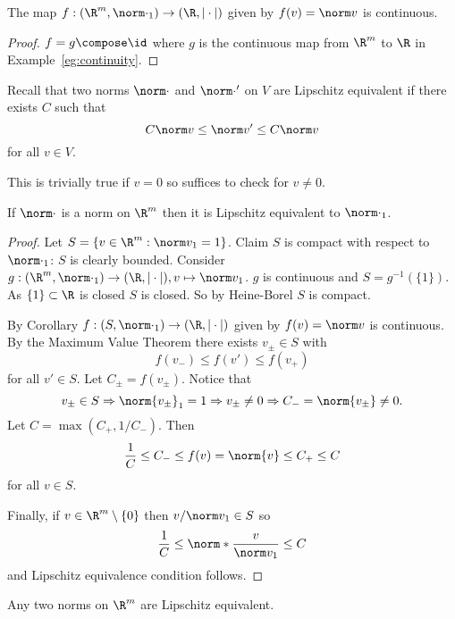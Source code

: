 \documentclass[a4paper]{article}
\theoremstyle{definition}
\begin{document}
\begin{corollary}
  The map \(f:(\R^m, \norm \cdot_1) \to (\R, |\cdot|)\) given by \(f(v) = \norm v\) is continuous.
\end{corollary}

\begin{proof}
  \(f = g\compose \id\) where \(g\) is the continuous map from \(\R^m\) to \(\R\) in Example~\ref{eg:continuity}.
\end{proof}

Recall that two norms \(\norm \cdot\) and \(\norm \cdot'\) on \(V\) are Lipschitz equivalent if there exists \(C\) such that
\[
  C\norm v \leq \norm v' \leq C \norm v
\]
for all \(v\in V\).

\begin{remark}
  This is trivially true if \(v=0\) so suffices to check for \(v\neq0\).
\end{remark}

\begin{theorem}
  \label{thm:Lipschitz equivalence}
  If \(\norm \cdot\) is a norm on \(\R^m\) then it is Lipschitz equivalent to \(\norm \cdot_1\).
\end{theorem}

\begin{proof}
  \label{proof:Lipschitz equivalence}
  Let \(S = \{v\in \R^m: \norm v_1 = 1 \}\). Claim \(S\) is compact with respect to \(\norm \cdot_1\): \(S\) is clearly bounded. Consider \(g:(\R^m, \norm \cdot_1) \to (\R, |\cdot|), v\mapsto \norm v_1\). \(g\) is continuous and \(S = g^{-1}(\{1\})\). As \(\{1\} \subset \R\) is closed \(S\) is closed. So by Heine-Borel \(S\) is compact.

  By Corollary \(f:(S, \norm \cdot_1) \to (\R, |\cdot|)\) given by \(f(v) = \norm v\) is continuous. By the Maximum Value Theorem there exists \(v_\pm\in S\) with
  \[
    f(v_-) \leq f(v') \leq f(v_+)
  \]
  for all \(v' \in S\). Let \(C_\pm = f(v_\pm)\). Notice that
  \[
    v_\pm\in S \Rightarrow \norm{v_\pm}_1 = 1 \Rightarrow v_\pm \neq0 \Rightarrow C_-=\norm{v_\pm} \neq 0.
  \]
  Let \(C = \max(C_+,1/C_-)\). Then
  \[
    \frac{1}{C} \leq C_- \leq f(v) = \norm{v} \leq C_+ \leq C
  \]
  for all \(v \in S\).

  Finally, if \(v \in \R^m\setminus\{0\}\) then \(v/\norm v_1 \in S\) so
  \[
    \frac{1}{C} \leq \norm*{\frac{v}{\norm v_1}} \leq C
  \]
  and Lipschitz equivalence condition follows.
\end{proof}

\begin{corollary}
  Any two norms on \(\R^m\) are Lipschitz equivalent.
\end{corollary}
\end{document}

